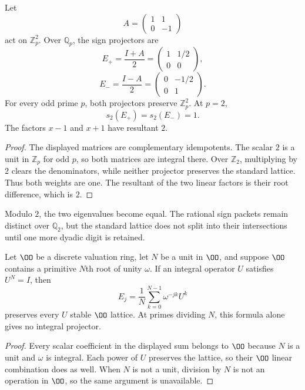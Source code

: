 \begin{proposition}\label{prop:sign_projectors}
Let
\[
A=
\begin{pmatrix}
1&1\\
0&-1
\end{pmatrix}
\]
act on $\mathbb Z_p^2$.  Over $\mathbb Q_p$, the sign projectors are
\[
E_+=\frac{I+A}{2}
=
\begin{pmatrix}
1&1/2\\
0&0
\end{pmatrix},
\]
\[
E_-=\frac{I-A}{2}
=
\begin{pmatrix}
0&-1/2\\
0&1
\end{pmatrix}.
\]
For every odd prime $p$, both projectors preserve $\mathbb Z_p^2$.  At $p=2$,
\[
s_2(E_+)=s_2(E_-)=1.
\]
The factors $x-1$ and $x+1$ have resultant $2$.
\end{proposition}

\begin{proof}
The displayed matrices are complementary idempotents.  The scalar $2$ is a unit in $\mathbb Z_p$ for odd $p$, so both matrices are integral there.  Over $\mathbb Z_2$, multiplying by $2$ clears the denominators, while neither projector preserves the standard lattice.  Thus both weights are one.  The resultant of the two linear factors is their root difference, which is $2$.
\end{proof}

Modulo $2$, the two eigenvalues become equal.  The rational sign packets remain distinct over $\mathbb Q_2$, but the standard lattice does not split into their intersections until one more dyadic digit is retained.

\begin{proposition}\label{prop:character_integrality}
Let $\OO$ be a discrete valuation ring, let $N$ be a unit in $\OO$, and suppose $\OO$ contains a primitive $N$th root of unity $\omega$.  If an integral operator $U$ satisfies $U^N=I$, then
\[
E_j=\frac1N\sum_{k=0}^{N-1}\omega^{-jk}U^k
\]
preserves every $U$ stable $\OO$ lattice.  At primes dividing $N$, this formula alone gives no integral projector.
\end{proposition}

\begin{proof}
Every scalar coefficient in the displayed sum belongs to $\OO$ because $N$ is a unit and $\omega$ is integral.  Each power of $U$ preserves the lattice, so their $\OO$ linear combination does as well.  When $N$ is not a unit, division by $N$ is not an operation in $\OO$, so the same argument is unavailable.
\end{proof}

